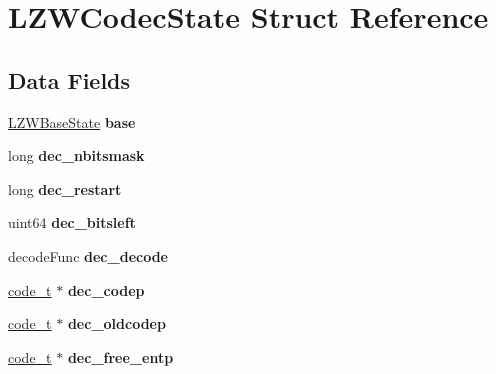 \hypertarget{struct_l_z_w_codec_state}{}\section{L\+Z\+W\+Codec\+State Struct Reference}
\label{struct_l_z_w_codec_state}
\subsection*{Data Fields}
\begin{DoxyCompactItemize}
\item 
\hypertarget{struct_l_z_w_codec_state_a4aece7ab69fa35ca082c8a4f248d426a}{}\hyperlink{struct_l_z_w_base_state}{L\+Z\+W\+Base\+State} {\bfseries base}\label{struct_l_z_w_codec_state_a4aece7ab69fa35ca082c8a4f248d426a}

\item 
\hypertarget{struct_l_z_w_codec_state_a09c50f2e9047c90d531d4ef25487b09a}{}long {\bfseries dec\+\_\+nbitsmask}\label{struct_l_z_w_codec_state_a09c50f2e9047c90d531d4ef25487b09a}

\item 
\hypertarget{struct_l_z_w_codec_state_a2017e380303238bde01b9da3a66739d2}{}long {\bfseries dec\+\_\+restart}\label{struct_l_z_w_codec_state_a2017e380303238bde01b9da3a66739d2}

\item 
\hypertarget{struct_l_z_w_codec_state_a27718b2d039eddd0402fa20fce767a97}{}uint64 {\bfseries dec\+\_\+bitsleft}\label{struct_l_z_w_codec_state_a27718b2d039eddd0402fa20fce767a97}

\item 
\hypertarget{struct_l_z_w_codec_state_afaed8fe93d8af0b7cee2d16d81293119}{}decode\+Func {\bfseries dec\+\_\+decode}\label{struct_l_z_w_codec_state_afaed8fe93d8af0b7cee2d16d81293119}

\item 
\hypertarget{struct_l_z_w_codec_state_adee66b0347b73ffcba16fc5c403f5d17}{}\hyperlink{structcode__ent}{code\+\_\+t} $\ast$ {\bfseries dec\+\_\+codep}\label{struct_l_z_w_codec_state_adee66b0347b73ffcba16fc5c403f5d17}

\item 
\hypertarget{struct_l_z_w_codec_state_aa28c864f872b4030dd3264b27e53152f}{}\hyperlink{structcode__ent}{code\+\_\+t} $\ast$ {\bfseries dec\+\_\+oldcodep}\label{struct_l_z_w_codec_state_aa28c864f872b4030dd3264b27e53152f}

\item 
\hypertarget{struct_l_z_w_codec_state_ae7e3aeddf8d63034041f2a1e64f305da}{}\hyperlink{structcode__ent}{code\+\_\+t} $\ast$ {\bfseries dec\+\_\+free\+\_\+entp}\label{struct_l_z_w_codec_state_ae7e3aeddf8d63034041f2a1e64f305da}


\end{DoxyCompactItemize}
